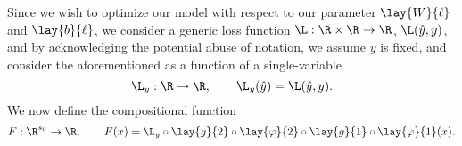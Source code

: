 Since we wish to optimize our model with respect to our parameter $\lay{W}{\ell}$ and $\lay{b}{\ell}$,  we consider a generic loss function $\L:\R\times\R\to\R$, $\L(\hat{y},y)$, and by acknowledging the potential abuse of notation, we assume $y$ is fixed, and consider the aforementioned as a function of a single-variable
$$\L_y:\R\to\R, \qquad \L_y(\hat{y})=\L(\hat{y},y).$$
We now define the compositional function
$$F:\R^{s_0}\to\R,\qquad F(x)=\L_y\circ\lay{g}{2}\circ\lay{\varphi}{2}\circ\lay{g}{1}\circ\lay{\varphi}{1}(x).$$

\begin{comment}
As we mentioned before, we wish to optimize with respect to our parameters, but our above composition doesn't make this dependence explicit for computations.  To this end, we first previously considered the generic affine-linear transformation
$$\varphi:\R^m\to\R^k,\qquad\varphi(x)=Wx+b,$$
with $W\in\R^{k\times m}, b\in\R^k$.  We now change our point-of-view and consider the related
$$\phi:\R^{k\times m}\times\R^k\to\R^k,\qquad \phi(W, b)=Wx+b,$$
for some fixed $x\in\R^m$.  Then we see that
$$d\phi:T\R^{k\times m}\times T\R^k\to T\R^k,$$
\begin{align*}
	d\phi_{(W,b)}(V,v)&=\rest{\frac{d}{dt}}_{t=0}\phi(W+tV, b+tv)\\
	&=\rest{\frac{d}{dt}}_{t=0}(W+tV)x+(b+tv)\\
	&=Vx+v.
\end{align*}
This leads to the further decomposition of the form
$$\phi(W,b)=\psi(W)+\id_{\R^k}(b),$$
where $\id_{\R^k}:\R^k\to\R^k$ is the identity function, and $\psi:\R^{k\times m}\to\R^k$ is given by
$$\psi(W)=Wx.$$
Then by the above computation, we have that
$$d\psi_W(V)=Vx.$$
Moreover, suppose
$$\{E_1^1,E_1^2,...,E_1^m,E_2^1,E_2^2,...,E_2^m,...,E_k^1,E_k^2,...,E_k^m\}$$
is an ordering of the standard basis $\{E_\alpha^\beta\}$ for $\R^{k\times m}$ with
$$[E_\alpha^\beta]^i_j=\delta^i_\alpha\delta_j^\beta,$$ and
$$V=V^i_jE_i^j,$$
then $d\psi_W\in\R^{k\times mk}$ with matrix-representation
$$d\psi_W=\begin{bmatrix}
	x^T&0&0&\cdots &0\\
	0&x^T&0&\cdots &0\\
	0&0&x^T&\cdots &0\\
	\vdots &\vdots &\ddots &\ddots &\vdots\\
	0&0&0&\cdots &x^T
\end{bmatrix},$$
where each $0$ represents $0\in\R^{1\times m}$, and
\begin{align*}
	d\psi_W(V)&=\begin{bmatrix}

\end{comment}
